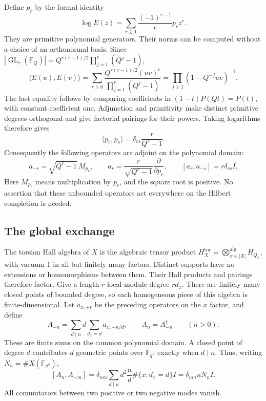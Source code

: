 Define $p_r$ by the formal identity
\[
 \log E(z)=\sum_{r\ge1}\frac{(-1)^{r-1}}r p_rz^r.
\]
They are primitive polynomial generators. Their norms can be computed
without a choice of an orthonormal basis. Since
$|\operatorname{GL}_r(\mathbb F_Q)|=Q^{r(r-1)/2}\prod_{j=1}^r(Q^j-1)$,
\[
 \langle E(u),E(v)\rangle
 =\sum_{r\ge0}\frac{Q^{r(r-1)/2}(\bar uv)^r}{\prod_{j=1}^r(Q^j-1)}
 =\prod_{j\ge1}(1-Q^{-j}\bar uv)^{-1}.
\]
The last equality follows by comparing coefficients in
$ (1-t)P(Qt)=P(t)$, with constant coefficient one.
Adjunction and primitivity make distinct primitive degrees orthogonal
and give factorial pairings for their powers. Taking logarithms therefore gives
\[
 \langle p_r,p_s\rangle=\delta_{rs}\frac{r}{Q^r-1}.
\]
Consequently the following operators are adjoint on the polynomial domain:
\[
 a_{-r}=\sqrt{Q^r-1}\,M_{p_r},\qquad
 a_r=\frac{r}{\sqrt{Q^r-1}}\frac{\partial}{\partial p_r},\qquad
 [a_r,a_{-s}]=r\delta_{rs}I.
\]
Here $M_{p_r}$ means multiplication by $p_r$, and the square root is positive.
No assertion that these unbounded operators act everywhere on the Hilbert
completion is needed.

\subsection{The global exchange}

The torsion Hall algebra of $X$ is the algebraic tensor product
$H_X^{\mathrm{tor}}=\bigotimes_{x\in|X|}^{\mathrm{alg}}H_{Q_x}$,
with vacuum $1$ in all but finitely many factors. Distinct supports have
no extensions or homomorphisms between them. Their Hall products and
pairings therefore factor. Give a length-$r$ local module degree $rd_x$.
There are finitely many closed points of bounded degree, so each
homogeneous piece of this algebra is finite-dimensional.
Let $a_{x,\pm r}$ be the preceding operators on the $x$ factor, and define
\[
 A_{-n}=\sum_{d\mid n}d\sum_{d_x=d}a_{x,-n/d},\qquad
 A_n=A_{-n}^{\dagger}\qquad(n>0).
\]
These are finite sums on the common polynomial domain. A closed point
of degree $d$ contributes $d$ geometric points over $\mathbb F_{q^n}$
exactly when $d\mid n$. Thus, writing $N_n=\#X(\mathbb F_{q^n})$,
\[
 [A_n,A_{-m}]
 =\delta_{nm}\sum_{d\mid n}d^2\frac nd\#\{x:d_x=d\}I
 =\delta_{nm}nN_nI.
\]
All commutators between two positive or two negative modes vanish.

